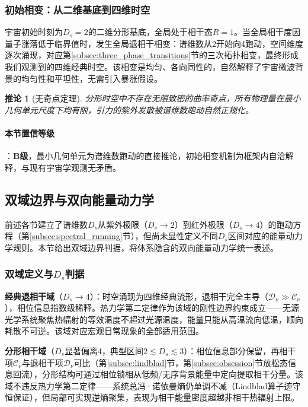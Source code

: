 \documentclass[12pt,a4paper,twocolumn]{article}
\newtheorem{corollary}[theorem]{推论}
\begin{document}
\subsubsection{初始相变：从二维基底到四维时空}
宇宙初始时刻为$D_s=2$的二维分形基底，全局处于相干态$R=1$。当全局相干度因量子涨落低于临界值时，发生全局退相干相变：谱维数从2开始向4跑动，空间维度逐次涌现，对应第\ref{subsec:three_phase_transitions}节的三次拓扑相变，最终形成我们观测到的四维经典时空。该相变是均匀、各向同性的，自然解释了宇宙微波背景的均匀性和平坦性，无需引入暴涨假设。

\begin{corollary}[无奇点定理]
分形时空中不存在无限致密的曲率奇点，所有物理量在最小几何单元尺度下均有限，引力的紫外发散被谱维数跑动自然正规化。
\end{corollary}

\paragraph{本节置信等级}：\textbf{B级}，最小几何单元为谱维数跑动的直接推论，初始相变机制为框架内自洽解释，与现有宇宙学观测无矛盾。

\subsection{双域边界与双向能量动力学}
\label{subsec:dual_domain}

前述各节建立了谱维数$D_s$从紫外极限（$D_s\to 2$）到红外极限（$D_s\to 4$）的跑动方程（第\ref{subsec:spectral_running}节），但尚未显性定义不同$D_s$区间对应的能量动力学规则。本节给出双域边界判据，将体系隐含的双向能量动力学统一表述。

\subsubsection{双域定义与$D_s$判据}

\textbf{经典退相干域}（$D_s \to 4$）：时空涌现为四维经典流形，退相干完全主导（$\mathcal{D}_\nu \gg \mathcal{C}_\nu$），相位信息指数级稀释。热力学第二定律作为该域的刚性边界约束成立——无源光学系统聚焦热辐射的等效温度不超过光源温度，能量只能从高温流向低温，顺向耗散不可逆。该域对应宏观日常现象的全部适用范围。

\textbf{分形相干域}（$D_s$显著偏离4，典型区间$2 \lesssim D_s \lesssim 3$）：相位信息部分保留，再相干项$\mathcal{C}_\nu$与退相干项$\mathcal{D}_\nu$可比（第\ref{subsec:lindblad}节，第\ref{subsec:obsession}节放松态信息回流），分形结构可通过相位锁相从低频/无序背景能量中定向提取相干分量。该域不违反热力学第二定律——系统总冯·诺依曼熵仍单调不减（Lindblad算子迹守恒保证），但局部可实现逆熵聚集，表现为相干能量密度超越非相干热辐射上限。
\end{document}
